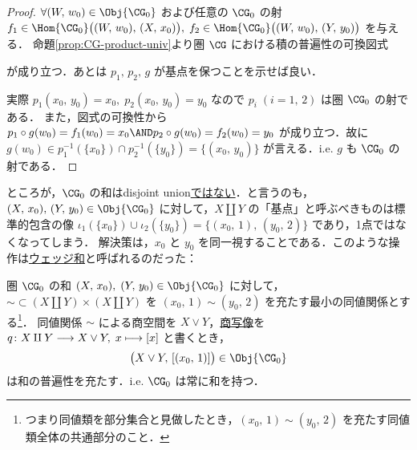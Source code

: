 \documentclass[algtopo_main]{subfiles}
\begin{document}
\begin{proof}
    $\forall (W,\, w_0) \in \Obj{\CG_0}$ および任意の $\CG_0$ の射 $f_1 \in \Hom{\CG_0}\bigl( (W,\, w_0),\, (X,\, x_0) \bigr),\; f_2 \in \Hom{\CG_0}\bigl( (W,\, w_0),\, (Y,\, y_0) \bigr)$ を与える．
    命題\ref{prop:CG-product-univ}より圏 $\CG$ における積の普遍性の可換図式
    \begin{center}
    \end{center}
    が成り立つ．あとは $p_1,\, p_2,\, g$ が基点を保つことを示せば良い．
    
    実際
    $p_1 (x_0,\, y_0) = x_0,\; p_2(x_0,\, y_0) = y_0$
    なので $p_i\; (i=1,\, 2)$ は圏 $\CG_0$ の射である．
    また，図式の可換性から $p_1 \circ g(w_0) = f_1(w_0) = x_0 \AND p_2 \circ g(w_0) = f_2(w_0) = y_0$ が成り立つ．故に $g(w_0) \in p_1^{-1}(\{x_0\}) \cap p_2^{-1}(\{y_0\}) = \{(x_0,\, y_0)\}$ が言える．i.e. $g$ も $\CG_0$ の射である．
\end{proof}

ところが，$\CG_0$ の和はdisjoint union\underline{ではない}．と言うのも，$(X,\, x_0),\, (Y,\, y_0) \in \Obj{\CG_0}$ に対して，$X \amalg Y$ の「基点」と呼ぶべきものは標準的包含の像 $\iota_1(\{x_0\}) \cup \iota_2 (\{y_0\}) = \{ (x_0,\, 1),\, (y_0,\, 2) \}$ であり，1点ではなくなってしまう．
解決策は，$x_0$ と $y_0$ を同一視することである．このような操作は\hyperref[def:smash]{ウェッジ和}と呼ばれるのだった：

\begin{myprop}[label=prop:CG0-sum]{圏 $\CG_0$ の和}
    $(X,\, x_0),\; (Y,\, y_0) \in \Obj{\CG_0}$ に対して，${\sim} \subset (X \amalg Y) \times (X \amalg Y)$ を $(x_0,\, 1) \sim (y_0,\, 2)$ を充たす最小の同値関係とする\footnote{つまり同値類を部分集合と見做したとき，$(x_0,\, 1) \sim (y_0,\, 2)$ を充たす同値類全体の共通部分のこと．}．
    同値関係 $\sim$ による商空間を $X \vee Y$，\hyperref[def:quotient-map]{商写像}を $q \colon X \amalg Y \longrightarrow X \vee Y,\; x \longmapsto [x]$ と書くとき，
    \begin{align}
        \bigl( X \vee Y,\, [(x_0,\, 1)]\bigr) \in \Obj{\CG_0}
    \end{align}
    は和の普遍性を充たす．i.e. $\CG_0$ は常に和を持つ．
\end{myprop}
\end{document}
